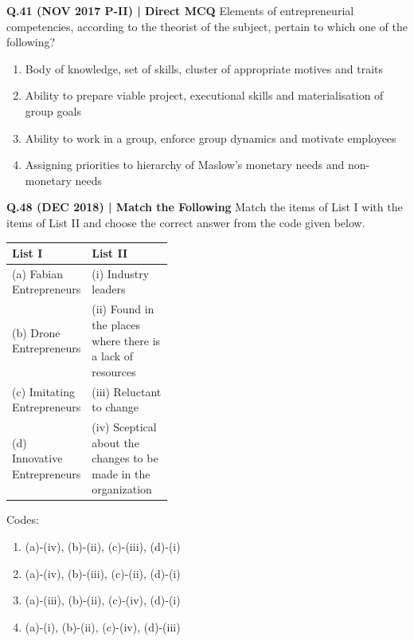 \documentclass{article}
\begin{document}
\textbf{Q.41 (NOV 2017 P-II) | Direct MCQ}
Elements of entrepreneurial competencies, according to the theorist of the subject, pertain to which one of the following?
\begin{enumerate}[label=(\arabic*)]
    \item Body of knowledge, set of skills, cluster of appropriate motives and traits
    \item Ability to prepare viable project, executional skills and materialisation of group goals
    \item Ability to work in a group, enforce group dynamics and motivate employees
    \item Assigning priorities to hierarchy of Maslow's monetary needs and non-monetary needs
\end{enumerate}

\textbf{Q.48 (DEC 2018) | Match the Following}
Match the items of List I with the items of List II and choose the correct answer from the code given below.
\begin{tabularx}{\linewidth}{@{} p{0.4\linewidth} X @{}}
    \toprule
    \textbf{List I} & \textbf{List II} \\
    \midrule
    (a) Fabian Entrepreneurs & (i) Industry leaders \\
    (b) Drone Entrepreneurs & (ii) Found in the places where there is a lack of resources \\
    (c) Imitating Entrepreneurs & (iii) Reluctant to change \\
    (d) Innovative Entrepreneurs & (iv) Sceptical about the changes to be made in the organization \\
    \bottomrule
\end{tabularx}
Codes:
\begin{enumerate}[label=(\arabic*)]
    \item (a)-(iv), (b)-(ii), (c)-(iii), (d)-(i)
    \item (a)-(iv), (b)-(iii), (c)-(ii), (d)-(i)
    \item (a)-(iii), (b)-(ii), (c)-(iv), (d)-(i)
    \item (a)-(i), (b)-(ii), (c)-(iv), (d)-(iii)
\end{enumerate}
\end{document}
